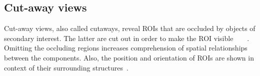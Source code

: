 \subsection{Cut-away views}
Cut-away views, also called cutaways, reveal ROIs that are occluded by objects of secondary interest. The latter are cut out in order to make the ROI visible~\cite{proc:volumeshop}~\cite{jour:adaptiveCutaways}~\cite{jour:correa}~\cite{incoll:cutawayIllustration}. Omitting the occluding regions increases comprehension of spatial relationships between the components. Also, the position and orientation of ROIs are shown in context of their surrounding structures~\cite{jour:interactiveCutaway}.

